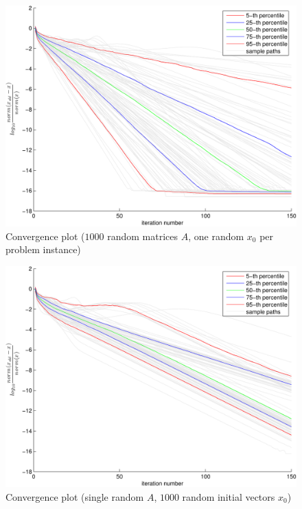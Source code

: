 \begin{figure}[htbp]
    \centering
    \includegraphics[width=\textwidth]{figures/convergenceBoxPlotDifferentA.pdf}
    \caption{Convergence plot ($1000$ random matrices $A$, one random $x_0$ per problem instance)}
    \label{fig:qcqpConvVar}  
\end{figure}

\begin{figure}[htbp]
    \centering
    \includegraphics[width=\textwidth]{figures/convergenceBoxPlotFixedA.pdf}
    \caption{Convergence plot (single random $A$, $1000$ random initial vectors $x_0$)}
    \label{fig:qcqpConvFix}
\end{figure}

